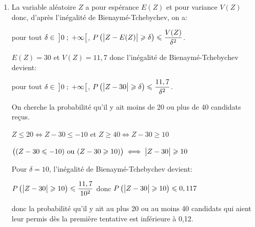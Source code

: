 \begin{enumerate}
\begin{enumerate}
Les variables $X$ et $Y$ sont indépendantes, donc on peut utiliser l'additivité de la variance: $V(Z)=V(X)+V(Y) \approx 1,89 + 9,81 = 11,7$.

	\item %
	
La variable aléatoire $Z$ a pour espérance $E(Z)$ et pour variance $V(Z)$ donc, d'après l'inégalité de Bienaymé-Tchebychev, on a:

pour tout $\delta\in\, \left ]0\;;\;+\infty\strut \right [$, $P\left ( \left |Z-E(Z)\strut \right | \geqslant \delta \right ) \leqslant \dfrac{V(Z)}{\delta^2}$.

$E(Z)=30$ et $V(Z)=11,7$ donc  l'inégalité de Bienaymé-Tchebychev devient:

pour tout $\delta\in\, \left ]0\;;\;+\infty\strut \right [$, $P\left ( \left |Z-30\strut \right | \geqslant \delta \right ) \leqslant \dfrac{11,7}{\delta^2}$.

On cherche la probabilité qu'il y ait moins de 20  ou plus de 40 candidats reçus.

$ Z\leqslant 20 \iff Z-30 \leqslant -10$ et $Z \geqslant 40 \iff Z-30 \geqslant 10$

$\left ( (Z-30 \leqslant -10) \text{ ou } (Z-30 \geqslant 10) \strut \right )\iff \left |Z-30 \strut \right | \geqslant 10$

Pour $\delta=10$, l'inégalité de Bienaymé-Tchebychev devient:

$P\left ( \left |Z-30\strut \right | \geqslant 10 \right ) \leqslant \dfrac{11,7}{10^2}$
donc
$P\left ( \left |Z-30\strut \right | \geqslant 10 \right ) \leqslant 0,117$

donc la probabilité qu'il y ait au plus 20 ou au moins 40 candidats qui aient leur permis dès la première tentative est inférieure à 0,12.
			\end{enumerate}
		\end{enumerate}

\bigskip

